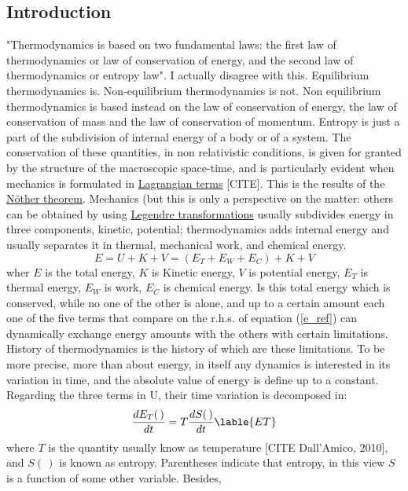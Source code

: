 \subsection{Introduction}

"Thermodynamics is based on two fundamental laws: the first law of thermodynamics or law of conservation of energy, and the second law of thermodynamics or entropy law".  I actually disagree with this. Equilibrium thermodynamics is. Non-equilibrium thermodynamics is not. Non equilibrium thermodynamics is based instead on the law of conservation of energy, the law of conservation of mass and the law of conservation of momentum. Entropy is just a part of the subdivision of internal energy of a body or of a system. The conservation of these quantities, in non relativistic conditions, is given for granted by the structure of the macroscopic space-time, and is particularly evident when mechanics is formulated in \href{https://en.wikipedia.org/wiki/Lagrangian_mechanics}{Lagrangian terms} [CITE]. This is the results of the \href{https://en.wikipedia.org/wiki/Noether%27s_theorem}{Nöther theorem}. 
Mechanics (but this is only a perspective on the matter: others can be obtained by using \href{https://en.wikipedia.org/wiki/Legendre_transformation}{Legendre transformations} usually subdivides energy in three components, kinetic, potential; thermodynamics adds internal  energy and usually separates it in thermal, mechanical work, and chemical energy.
\begin{equation}
E = U  + K + V = (E_T + E_W + E_C) + K + V
\label{e_cons}
\end{equation}
wher $E$ is the total energy, $K$ is Kinetic energy, $V$ is potential energy, $E_T$ is thermal energy, $E_W$ is work, $E_C$ is chemical energy. Is this total energy which is conserved, while no one of the other is alone, and up to a certain amount each one of the five terms that compare on the r.h.s. of equation (\ref{e_ref}) can dynamically exchange energy amounts with the others with certain limitations. 
History of thermodynamics is the history of which are these limitations. To be more precise, more than about energy, in itself any dynamics is interested in its variation in time, and the absolute value of energy is define up to a constant. 
Regarding the three terms in U, their time variation is decomposed in:
\begin{equation}
\frac{dE_T(\,)}{dt} = T \frac{dS(\,)}{dt}
\lable{ET}
\end{equation}
where $T$ is the quantity usually know as temperature [CITE Dall'Amico, 2010], and $S(\,)$ is known as entropy. Parentheses indicate that entropy, in this view $S$ is a function of some other variable. Besides, 
